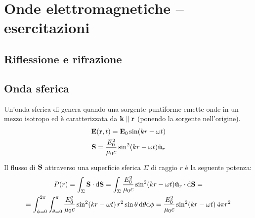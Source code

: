 \chapter{Onde elettromagnetiche -- esercitazioni}

\section{Riflessione e rifrazione}






\section{Onda sferica}

Un'onda sferica di genera quando una sorgente puntiforme emette onde in un mezzo isotropo ed è caratterizzata da $\mathbf{k} \parallel \mathbf{r}$ (ponendo la sorgente nell'origine).
\begin{gather}
    \mathbf{E}(\mathbf{r}, t) = \mathbf{E}_0 \sin(k r - \omega t) \\
    \mathbf{S} = \frac{E_0^2}{\mu_0 c} \sin^2(kr - \omega t) \hat{\mathbf{u}}_{r}
\end{gather}

Il flusso di $\mathbf{S}$ attraverso una superficie sferica $\Sigma$ di raggio $r$ è la seguente potenza:
\begin{equation}
\begin{gathered}
    P(r) = \int_\Sigma \mathbf{S} \cdot \mathrm{d} \mathbf{S} = \int_{\Sigma} \frac{E_0^2}{\mu_0 c} \sin^2(kr - \omega t) \hat{\mathbf{u}}_{r} \cdot \mathrm{d} \mathbf{S} = \\
    = \int_{\phi = 0}^{2\pi} \int_{\theta = 0}^{\pi} \frac{E_0^2}{\mu_0 c} \sin^2(kr - \omega t) \, r^2 \sin\theta \, \mathrm{d}\theta \mathrm{d}\phi
    = \frac{E_0^2}{\mu_0 c} \sin^2(kr - \omega t) \, 4 \pi r^2
\end{gathered}
\end{equation}

